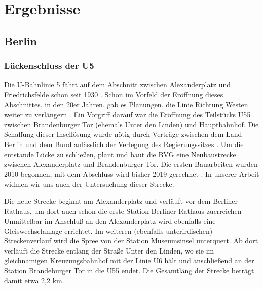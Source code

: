 \section{Ergebnisse}

\begin{comment}

Gliederung meiner Streckenbeschreibung (Yves)

* Übersicht
  * Umfeld des Bauprojekts
  * von wo nach wo
  * historische Einordnung

* konkrter Streckenverlauf
  * detalierte Daten (weichen etc ..)


* Probleme
  * bautechnisch
  * gesellschaftlich

* Zeitplan

* Kosten
\end{comment}



\subsection{Berlin}
\subsubsection*{Lückenschluss der U5}

Die U-Bahnlinie 5 fährt auf dem Abschnitt zwischen Alexanderplatz und
Friedrichsfelde schon seit 1930 \cite{bkhU5}. Schon im Vorfeld der
Eröffnung dieses Abschnittes, in den 20er Jahren, gab es Planungen, die Linie
Richtung Westen weiter zu verlängern \cite{bvgWebsiteU5}. Ein Vorgriff darauf
war die Eröffnung des Teilstücks U55 zwischen Brandenburger Tor (ehemals Unter
den Linden) und Hauptbahnhof. Die Schaffung dieser Insellösung wurde
nötig durch Verträge zwischen dem Land Berlin und dem Bund anlässlich der
Verlegung des Regierungssitzes \cite{hauptstadtvertrag}. Um die entstande Lücke
zu schließen, plant und baut die BVG eine Neubaustrecke zwischen Alexanderplatz
und Brandenburger Tor. Die ersten Bauarbeiten wurden 2010 begonnen, mit dem
Abschluss wird bisher 2019 gerechnet \cite{bvgWebsiteU5plan}. In unserer Arbeit
widmen wir uns auch der Untersuchung dieser Strecke.

Die neue Strecke beginnt am Alexanderplatz und verläuft vor dem Berliner Rathaus,
um dort auch schon die erste Station Berliner Rathaus zuerreichen
\cite{bkhU5} \cite{bvgWebsiteU5} Unmittelbar im Anschluß an den
Alexanderplatz wird ebenfalls eine Gleiswechselanlage errichtet. Im weiteren
(ebenfalls unterirdischen) Streckenverlauf wird die Spree von der Station
Museumsinsel unterquert. Ab dort verläuft die Strecke entlang der Straße Unter
den Linden, wo sie im gleichnamigen Kreuzungsbahnhof mit der Linie U6 hält und
anschließend an der Station Brandeburger Tor in die U55 endet. Die Gesamtläng der
Strecke beträgt damit etwa 2,2 km.

